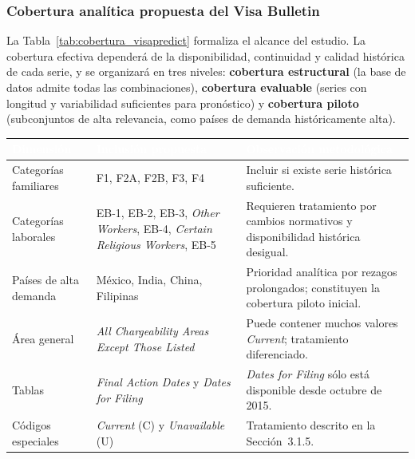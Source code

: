 \documentclass[12pt,letterpaper]{report}
\begin{document}
\subsubsection*{Cobertura analítica propuesta del Visa Bulletin}

La Tabla~\ref{tab:cobertura_visapredict} formaliza el alcance del estudio. La cobertura efectiva dependerá de la disponibilidad, continuidad y calidad histórica de cada serie, y se organizará en tres niveles: \textbf{cobertura estructural} (la base de datos admite todas las combinaciones), \textbf{cobertura evaluable} (series con longitud y variabilidad suficientes para pronóstico) y \textbf{cobertura piloto} (subconjuntos de alta relevancia, como países de demanda históricamente alta).

\begin{table}[H]
    \centering
    \footnotesize
    \setlength{\arrayrulewidth}{0.7pt}
    \setlength{\tabcolsep}{4pt}
    \begin{tabular}{>{\raggedright\arraybackslash}p{3.2cm}
                    >{\raggedright\arraybackslash}p{4.4cm}
                    >{\raggedright\arraybackslash}p{5.0cm}}
        \hline
        \rowcolor{uacjblue!85}
        \textcolor{white}{\textbf{Dimensión}} &
        \textcolor{white}{\textbf{Inclusión propuesta}} &
        \textcolor{white}{\textbf{Observación metodológica}} \\
        \hline
        \rowcolor{uacjblue!4}
        Categorías familiares & F1, F2A, F2B, F3, F4 & Incluir si existe serie histórica suficiente. \\
        Categorías laborales & EB-1, EB-2, EB-3, \textit{Other Workers}, EB-4, \textit{Certain Religious Workers}, EB-5 & Requieren tratamiento por cambios normativos y disponibilidad histórica desigual. \\
        \rowcolor{uacjblue!4}
        Países de alta demanda & México, India, China, Filipinas & Prioridad analítica por rezagos prolongados; constituyen la cobertura piloto inicial. \\
        Área general & \textit{All Chargeability Areas Except Those Listed} & Puede contener muchos valores \textit{Current}; tratamiento diferenciado. \\
        \rowcolor{uacjblue!4}
        Tablas & \textit{Final Action Dates} y \textit{Dates for Filing} & \textit{Dates for Filing} sólo está disponible desde octubre de 2015. \\
        Códigos especiales & \textit{Current} (C) y \textit{Unavailable} (U) & Tratamiento descrito en la Sección~3.1.5. \\

\end{tabular}
\end{table}
\end{document}
